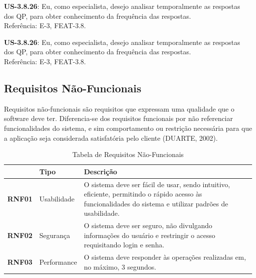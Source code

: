 \begin{itemize}
{\begin{itemize}
{					\item \textbf{US-3.8.26}: Eu, como especialista, desejo analisar temporalmente as respostas dos QP, para obter conhecimento da frequência das respostas.\\
					Referência: E-3, FEAT-3.8.

					\item \textbf{US-3.8.26}: Eu, como especialista, desejo analisar temporalmente as respostas dos QP, para obter conhecimento da frequência das respostas.\\
					Referência: E-3, FEAT-3.8.
				}
				\end{itemize}
			}
			\end{itemize}


	\subsection{Requisitos Não-Funcionais}

		Requisitos não-funcionais são requisitos que expressam uma qualidade que o software deve ter. Diferencia-se dos requisitos funcionais por não referenciar funcionalidades do sistema, e sim comportamento ou restrição necessária para que a aplicação seja considerada satisfatória pelo cliente (DUARTE, 2002).

		\vspace*{0.5cm}

		\begin{table}[htbp]
			\caption{Tabela de Requisitos Não-Funcionais}
			\begin{tabular}{|l|l|p{11cm}|}
				\hline
				 & \textbf{Tipo} & \textbf{Descrição} \\ \hline
				\textbf{RNF01} & Usabilidade  & O sistema deve ser fácil de usar, sendo intuitivo, eficiente, permitindo o rápido acesso às funcionalidades do sistema e utilizar padrões de usabilidade. \\ \hline

				\textbf{RNF02} & Segurança & O sistema deve ser seguro, não divulgando informações do usuário e restringir o acesso requisitando login e senha. \\ \hline

				\textbf{RNF03} & Performance & O sistema deve responder às operações realizadas em, no máximo, 3 segundos. \\ \hline
			\end{tabular}
		\label{Tabela de Requisitos Não-Funcionais}
		\end{table}


